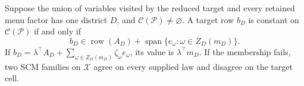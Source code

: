 Suppose the union of variables visited by the reduced target and every retained menu factor has one district \(D\), and \(\mathcal C(\mathcal P)\ne\varnothing\). A target row \(b_D\) is constant on \(\mathcal C(\mathcal P)\) if and only if \[b_D\in\operatorname{row}(A_D)+\operatorname{span}\{e_\omega:\omega\in Z_D(m_D)\}.\] If \(b_D=\lambda^\top A_D+\sum_{\omega\in Z_D(m_D)}\zeta_\omega e_\omega\), its value is \(\lambda^\top m_D\). If the membership fails, two SCM families on \(\mathcal X\) agree on every supplied law and disagree on the target cell.